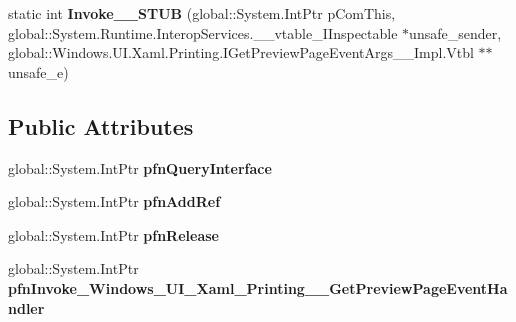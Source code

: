 \begin{DoxyCompactItemize}
\item 
\mbox{\label{struct_windows_1_1_u_i_1_1_xaml_1_1_printing_1_1_get_preview_page_event_handler_____impl_1_1_vtbl_ad68bac72d5a24eec5e88db46ab1e37a1}} 
static int {\bfseries Invoke\+\_\+\+\_\+\+S\+T\+UB} (global\+::\+System.\+Int\+Ptr p\+Com\+This, global\+::\+System.\+Runtime.\+Interop\+Services.\+\_\+\+\_\+vtable\+\_\+\+I\+Inspectable $\ast$unsafe\+\_\+sender, global\+::\+Windows.\+U\+I.\+Xaml.\+Printing.\+I\+Get\+Preview\+Page\+Event\+Args\+\_\+\+\_\+\+Impl.\+Vtbl $\ast$$\ast$unsafe\+\_\+e)
\end{DoxyCompactItemize}
\subsection*{Public Attributes}
\begin{DoxyCompactItemize}
\item 
\mbox{\label{struct_windows_1_1_u_i_1_1_xaml_1_1_printing_1_1_get_preview_page_event_handler_____impl_1_1_vtbl_a39570404e700f7bcda63964c919a7659}} 
global\+::\+System.\+Int\+Ptr {\bfseries pfn\+Query\+Interface}
\item 
\mbox{\label{struct_windows_1_1_u_i_1_1_xaml_1_1_printing_1_1_get_preview_page_event_handler_____impl_1_1_vtbl_a1514712591c19b8423bf15b3c7f87f40}} 
global\+::\+System.\+Int\+Ptr {\bfseries pfn\+Add\+Ref}
\item 
\mbox{\label{struct_windows_1_1_u_i_1_1_xaml_1_1_printing_1_1_get_preview_page_event_handler_____impl_1_1_vtbl_af90acae7497b57b92ec0cdfce8cf3c86}} 
global\+::\+System.\+Int\+Ptr {\bfseries pfn\+Release}
\item 
\mbox{\label{struct_windows_1_1_u_i_1_1_xaml_1_1_printing_1_1_get_preview_page_event_handler_____impl_1_1_vtbl_ab976f8b29bec065b5c5a9e0e3e384169}} 
global\+::\+System.\+Int\+Ptr {\bfseries pfn\+Invoke\+\_\+\+Windows\+\_\+\+U\+I\+\_\+\+Xaml\+\_\+\+Printing\+\_\+\+\_\+\+Get\+Preview\+Page\+Event\+Handler}
\end{DoxyCompactItemize}
